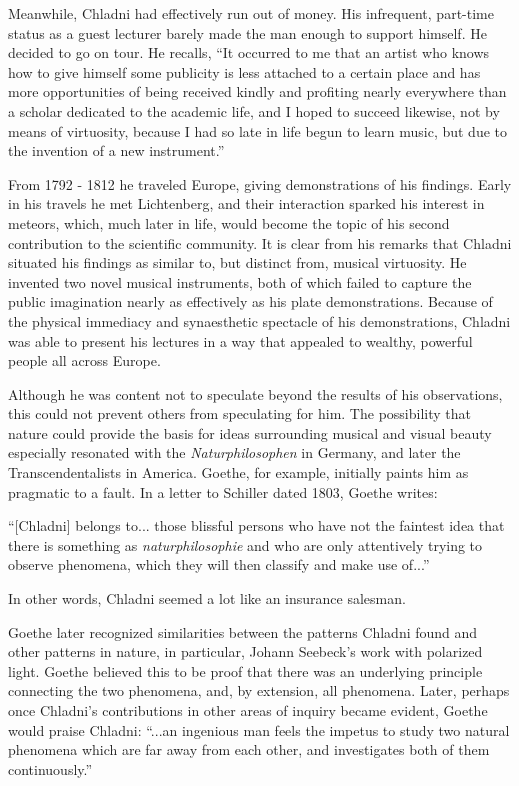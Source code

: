 \documentclass[a4paper,10pt]{report}
\numberwithin{equation}{section}
\begin{document}
Meanwhile, Chladni had effectively run out of money. His infrequent, part-time status as a guest lecturer barely made the man enough to support himself.\cite[p.~27]{Ullmann2007} He decided to go on tour. He recalls, 
``It occurred to me that an artist who knows how to give himself some publicity is less attached to a certain place and has more opportunities of being received kindly and profiting nearly everywhere than a scholar dedicated to the academic life, and I hoped to succeed likewise, not by means of virtuosity, because I had so late in life begun to learn music, but due to the invention of a new instrument.''\cite[p.~17]{Stockmann2007}

From 1792 - 1812 he traveled Europe, giving demonstrations of his findings.\cite[p.~21]{Stockmann2007} Early in his travels he met Lichtenberg, and their interaction sparked his interest in meteors, which, much later in life, would become the topic of his second contribution to the scientific community.\cite[p.~28]{Ullmann2007} It is clear from his remarks that Chladni situated his findings as similar to, but distinct from, musical virtuosity. He invented two novel musical instruments, both of which failed to capture the public imagination nearly as effectively as his plate demonstrations. Because of the physical immediacy and synaesthetic spectacle of his demonstrations, Chladni was able to present his lectures in a way that appealed to wealthy, powerful people all across Europe. 

Although he was content not to speculate beyond the results of his observations, this could not prevent others from speculating for him.\cite[p.~13]{Bonds2012} The possibility that nature could provide the basis for ideas surrounding musical and visual beauty especially resonated with the \emph{Naturphilosophen} in Germany, and later the Transcendentalists in America.\cite[p.~15]{Bonds2012} Goethe, for example, initially paints him as pragmatic to a fault. In a letter to Schiller dated 1803, Goethe writes: 

``[Chladni] belongs to... those blissful persons who have not the faintest idea that there is something as \emph{naturphilosophie} and who are only attentively trying to observe phenomena, which they will then classify and make use of...''\cite[p.~18]{Stockmann2007}

In other words, Chladni seemed a lot like an insurance salesman.

Goethe later recognized similarities between the patterns Chladni found and other patterns in nature, in particular, Johann Seebeck's work with polarized light. Goethe believed this to be proof that there was an underlying principle connecting the two phenomena, and, by extension, all phenomena.\cite[p.~17]{Bonds2012} Later, perhaps once Chladni's contributions in other areas of inquiry became evident, Goethe would praise Chladni: ``...an ingenious man feels the impetus to study two natural phenomena which are far away from each other, and investigates both of them continuously.''\cite[p.~31]{Ullmann2007}
\end{document}

